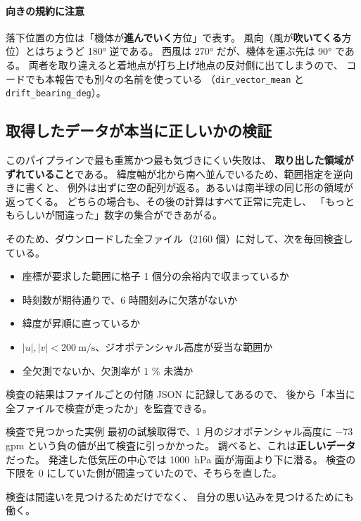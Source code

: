 \paragraph{向きの規約に注意}
落下位置の方位は「機体が\textbf{進んでいく}方位」で表す。
風向（風が\textbf{吹いてくる}方位）とはちょうど \ang{180} 逆である。
西風は \ang{270} だが、機体を運ぶ先は \ang{90} である。
両者を取り違えると着地点が打ち上げ地点の反対側に出てしまうので、
コードでも本報告でも別々の名前を使っている
（\texttt{dir\_vector\_mean} と \texttt{drift\_bearing\_deg}）。

\subsection{取得したデータが本当に正しいかの検証}

このパイプラインで最も重篤かつ最も気づきにくい失敗は、
\textbf{取り出した領域がずれていること}である。
緯度軸が北から南へ並んでいるため、範囲指定を逆向きに書くと、
例外は出ずに空の配列が返る。あるいは南半球の同じ形の領域が返ってくる。
どちらの場合も、その後の計算はすべて正常に完走し、
「もっともらしいが間違った」数字の集合ができあがる。

そのため、ダウンロードした全ファイル（2160 個）に対して、次を毎回検査している。

\begin{itemize}
  \item 座標が要求した範囲に格子 1 個分の余裕内で収まっているか
  \item 時刻数が期待通りで、6 時間刻みに欠落がないか
  \item 緯度が昇順に直っているか
  \item $|u|, |v| < \SI{200}{\metre\per\second}$、ジオポテンシャル高度が妥当な範囲か
  \item 全欠測でないか、欠測率が 1 \% 未満か
\end{itemize}

検査の結果はファイルごとの付随 JSON に記録してあるので、
後から「本当に全ファイルで検査が走ったか」を監査できる。

\begin{whybox}{検査で見つかった実例}
最初の試験取得で、1 月のジオポテンシャル高度に $-73$ gpm という負の値が出て検査に引っかかった。
調べると、これは\textbf{正しいデータ}だった。
発達した低気圧の中心では \SI{1000}{\hecto\pascal} 面が海面より下に潜る。
検査の下限を 0 にしていた側が間違っていたので、そちらを直した。

検査は間違いを見つけるためだけでなく、
自分の思い込みを見つけるためにも働く。
\end{whybox}
